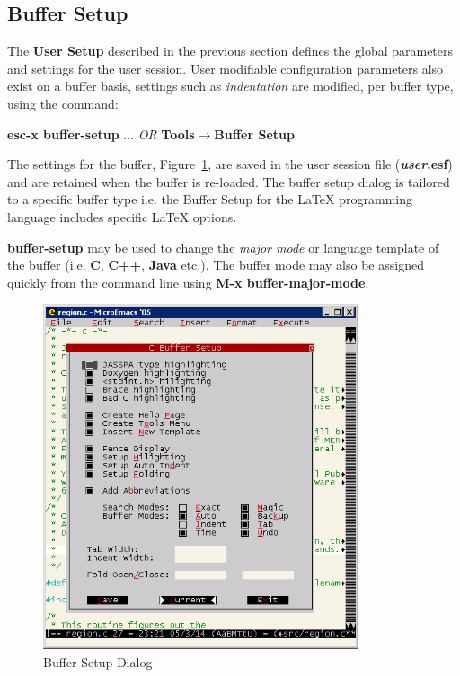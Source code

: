 \documentclass[11pt,a4paper,pdftex]{article}
\begin{document}
\subsection{Buffer Setup}

  The \textbf{User Setup} described in the previous section defines the global
  parameters and settings for the user session. User modifiable configuration
  parameters also exist on a buffer basis, settings such as
  \textit{indentation} are modified, per buffer type, using the command:
  
  \textbf{esc-x buffer-setup} $\dots$ \textit{OR}\newline
  \textbf{Tools$\rightarrow$Buffer Setup}
  
  The settings for the buffer, Figure~\ref{fig:buffersetup}, are saved in the
  user session file (\textbf{\textit{user}.esf}) and are retained when the
  buffer is re-loaded. The buffer setup dialog is tailored to a specific
  buffer type i.e. the Buffer Setup for the LaTeX programming language
  includes specific LaTeX options. 
  
  \textbf{buffer-setup} may be used to change the \textit{major mode} or
  language template of the buffer (i.e. \textbf{C}, \textbf{C++},
  \textbf{Java} etc.). The buffer mode may also be assigned quickly from the
  command line using \textbf{M-x buffer-major-mode}.
  
\begin{figure}[!hbt]
  \begin{center}
    \includegraphics[keepaspectratio,height=4in]{buffersetup}
    \caption{Buffer Setup Dialog}
    \label{fig:buffersetup}
  \end{center}
\end{figure}
  
\end{document}
